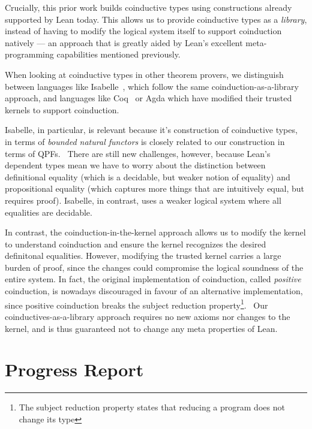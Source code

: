 \documentclass[a4paper]{scrartcl}
\begin{document}
Crucially, this prior work builds coinductive types using constructions
already supported by Lean today. This allows us to provide coinductive
types as a \emph{library}, instead of having to modify the logical
system itself to support coinduction natively --- an approach that is
greatly aided by Lean's excellent meta-programming capabilities
mentioned previously.

When looking at coinductive types in other theorem provers, we
distinguish between languages like Isabelle~\cite{traytelCategoryTheoryBased}, which follow the same
coinduction-as-a-library approach, and languages like Coq~\cite{gimenezTutorialRecursiveTypes1998,gimenezApplicationCoinductiveTypes1996}
or Agda which have modified their trusted kernels to support
coinduction.

Isabelle, in particular, is relevant because it's construction of
coinductive types, in terms of \emph{bounded natural functors} is
closely related to our construction in terms of QPFs.~\cite{furerQuotientsBoundedNatural2022} 
There are still new
challenges, however, because Lean's dependent types mean we have to
worry about the distinction between definitional equality (which is a
decidable, but weaker notion of equality) and propositional equality
(which captures more things that are intuitively equal, but requires
proof). Isabelle, in contrast, uses a weaker logical system where all
equalities are decidable.

In contrast, the coinduction-in-the-kernel approach allows us to modify
the kernel to understand coinduction and ensure the kernel recognizes
the desired definitonal equalities. However, modifying the trusted
kernel carries a large burden of proof, since the changes could
compromise the logical soundness of the entire system. In fact, the
original implementation of coinduction, called \emph{positive}
coinduction, is nowadays discouraged in favour of an alternative
implementation, since positive coinduction breaks the subject reduction
property\footnote{The subject reduction property states that reducing a program does not change its type}.~\cite{sozeauCorrectCompleteType}
Our coinductives-as-a-library approach requires no new axioms nor
changes to the kernel, and is thus guaranteed not to change any meta
properties of Lean.


\section{Progress Report}\label{progress-report}
\end{document}
